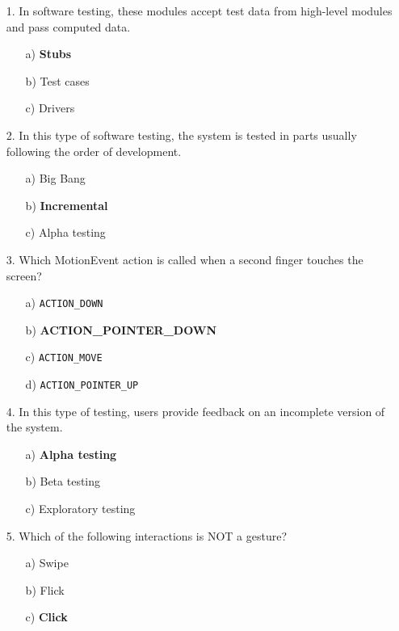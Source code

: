 \documentclass[12pt]{book}
\begin{document}
\begin{itemize}
    \item[1.] In software testing, these modules accept test data from high-level modules and pass computed data.
    \begin{itemize}
        \item[a)] \textbf{Stubs}
        \item[b)] Test cases
        \item[c)] Drivers
    \end{itemize}

    \item[2.] In this type of software testing, the system is tested in parts usually following the order of development.
    \begin{itemize}
        \item[a)] Big Bang
        \item[b)] \textbf{Incremental}
        \item[c)] Alpha testing
    \end{itemize}

    \item[3.] Which MotionEvent action is called when a second finger touches the screen?
    \begin{itemize}
        \item[a)] \texttt{ACTION\_DOWN}
        \item[b)] \textbf{ACTION\_POINTER\_DOWN}
        \item[c)] \texttt{ACTION\_MOVE}
        \item[d)] \texttt{ACTION\_POINTER\_UP}
    \end{itemize}

    \item[4.] In this type of testing, users provide feedback on an incomplete version of the system.
    \begin{itemize}
        \item[a)] \textbf{Alpha testing}
        \item[b)] Beta testing
        \item[c)] Exploratory testing
    \end{itemize}

    \item[5.] Which of the following interactions is NOT a gesture?
    \begin{itemize}
        \item[a)] Swipe
        \item[b)] Flick
        \item[c)] \textbf{Click}
    \end{itemize}


\end{itemize}
\end{document}
